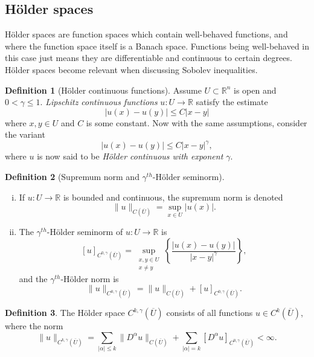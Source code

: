 \documentclass[11pt]{article}
\theoremstyle{definition}
\newtheorem*{definition}{Definition}
\begin{document}
\newpage

\subsection{H\"{o}lder spaces}
H\"{o}lder spaces are function spaces which contain well-behaved functions, and where the function space itself is a Banach space.
Functions being well-behaved in this case just means they are differentiable and continuous to certain degrees.
H\"{o}lder spaces become relevant when discussing Sobolev inequalities.

\begin{definition}[H\"{o}lder continuous functions]
Assume $U \subset \mathbb{R}^n$ is open and $0 < \gamma \leq 1$.
\textit{Lipschitz continuous functions} $u : U \rightarrow \mathbb{R}$
satisfy the estimate
\[|u(x) - u(y)| \leq C|x-y|\]
where $x,y \in U$ and $C$ is some constant.
Now with the same assumptions, consider the variant
\[|u(x) - u(y)| \leq C|x-y|^{\gamma},\]
where $u$ is now said to be \textit{H\"{o}lder continuous with exponent $\gamma$}.
\end{definition}

\begin{definition}[Supremum norm and $\gamma^{th}$-H\"{o}lder seminorm]
\begin{enumerate}[(i)]
\item If $u : U \rightarrow \mathbb{R}$ is bounded and continuous, the supremum norm is denoted
\[\|u\|_{C(\overline{U})} = \sup_{x \in U}{|u(x)|}.\]

\item The $\gamma^{th}$-H\"{o}lder seminorm of $u : U \rightarrow \mathbb{R}$ is
\[[u]_{C^{0,\gamma}(\overline{U})} = \sup_{\substack{x,y\in U \\ x\not= y}}\left\{\frac{|u(x) - u(y)|}{|x-y|^{\gamma}}\right\},\]
and the $\gamma^{th}$-H\"{o}lder norm is
\[\|u\|_{C^{0,\gamma}(\overline{U})} = \|u\|_{C(\overline{U})} + [u]_{C^{0,\gamma}(\overline{U})}.\]
\end{enumerate}
\end{definition}

\begin{definition}
The H\"{o}lder space $C^{k,\gamma}(\overline{U})$ consists of all functions $u \in C^k(\overline{U})$,
where the norm
\[\|u\|_{C^{k,\gamma}(\overline{U})} = \sum_{|\alpha| \leq k}\|D^{\alpha}u\|_{C(\overline{U})} + \sum_{|\alpha| = k}[D^{\alpha}u]_{C^{0,\gamma}(\overline{U})} < \infty.\]
\end{definition}
\end{document}
